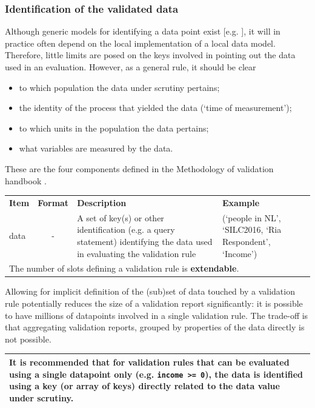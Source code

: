 \documentclass[a4paper, 11pt]{article}
\newcommand{\code}[1]{\texttt{#1}}
\begin{document}
\subsubsection{Identification of the validated data}
Although generic models for identifying a data point exist [e.g.
\citet[Chapter~5]{zio2015methodology}], it will in practice often depend on the
local implementation of a local data model. Therefore, little limits are posed
on the keys involved in pointing out the data used in an evaluation. However,
as a general rule, it should be clear 
\begin{itemize}[itemsep=0pt]
\item to which population the data under scrutiny pertains;
\item the identity of the process that yielded the data (`time of measurement');
\item to which units in the population the data pertains;
\item what variables are measured by the data.
\end{itemize}
These are the four components defined in the Methodology of validation handbook 
\citep{zio2015methodology}.


\begin{center}
\begin{tabular}{|lp{15mm}p{}p{}|}
\hline
\textbf{Item} & \textbf{Format} & \textbf{Description} &\textbf{Example}\\
data    &\multicolumn{1}{c}{-} & A set of key(s) or other identification (e.g.
a query statement) identifying the data used in evaluating the validation rule
&  (`people in NL', `SILC2016, `Ria Respondent', `Income')\\
\hline
\multicolumn{4}{|l|}{The number of slots defining a validation rule is \textbf{extendable}.
}\\
\hline
\end{tabular}
\end{center}


Allowing for implicit definition of the (sub)set of data touched by a
validation rule potentially reduces the size of a validation report
significantly: it is possible to have millions of datapoints involved in a
single validation rule. The trade-off is that aggregating validation reports,
grouped by properties of the data directly is not possible.

\begin{tabular}{|p{}|}
\hline
It is recommended that for validation rules that can be evaluated using a
single datapoint only (e.g. \code{income >= 0}), the data is identified using a
key (or array of keys) directly related to the data value under scrutiny.\\
\hline
\end{tabular}
\end{document}
